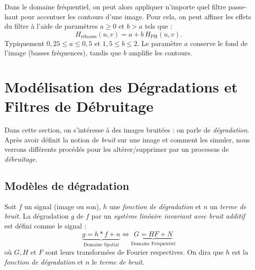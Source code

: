 \begin{proposition}
    Dans le domaine fréquentiel, on peut alors appliquer n'importe quel filtre passe-haut pour accentuer les contours d'une image. Pour cela, on peut affiner les effets du filtre à l'aide de paramètres $a \geqslant 0$ et $ b > a$ tels que : 
    \begin{equation}
        \boxed{H_{\text{réhauss}}(u,v) = a + b \, H_{\text{PH}}(u,v).}
    \end{equation}
    Typiquement $0{,}25 \leqslant a \leqslant 0{,}5$ et $1{,}5 \leqslant b \leqslant 2$. Le paramètre $a$ conserve le fond de l'image (basses fréquences), tandis que $b$ amplifie les contours.
\end{proposition}



\section{Modélisation des Dégradations et Filtres de Débruitage}

Dans cette section, on s'intéresse à des images bruitées : on parle de \emph{dégradation}. Après avoir définit la notion de \emph{bruit} sur une image et comment les simuler, nous verrons différents procédés pour les altérer/supprimer par un processus de \emph{débruitage}. 

\subsection{Modèles de dégradation}

\begin{definition}
    Soit $f$ un signal (image ou son), $h$ une \emph{fonction de dégradation} et $n$ un \emph{terme de bruit}. La dégradation $g$ de $f$ par un \emph{système linéaire invariant avec bruit additif} est défini comme le signal : 
    \begin{equation}
        \underbrace{g = h * f + n}_{\text{Domaine Spatial}} \iff \underbrace{G = H F + N}_{\text{Domaine Fréquentiel}}
    \end{equation}
    où $G, H$ et $F$ sont leurs transformées de Fourier respectives. On dira que $h$ est la \emph{fonction de dégradation} et $n$ le \emph{terme de bruit}. 
\end{definition}

